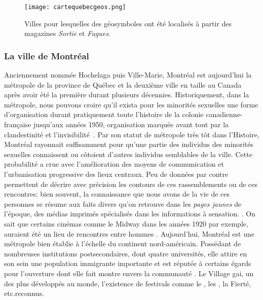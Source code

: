 \begin{figure}[ht]
 \begin{center}
 \texttt{[image: cartequebecgeos.png]}
 \end{center}
 \caption[Villes sélections à partir de \emph{Sortie} et \emph{Fugues}.]{Villes pour lesquelles des géosymboles ont été localisés à partir des magazines \emph{Sortie} et \emph{Fugues}.}\label{fig:cartequebecgeos}
\end{figure}

\subsubsection{La ville de Montréal}
\label{ssub:montreal}
Anciennement nommée Hochelaga puis Ville-Marie, Montréal est aujourd'hui la métropole de la province de Québec et la deuxième ville en taille au Canada après avoir été la première durant plusieurs décennies.
Historiquement, dans la métropole, nous pouvons croire qu'il exista pour les minorités sexuelles une forme d'organisation durant pratiquement toute l'histoire de la colonie canadienne-française jusqu’aux années 1950, organisation marquée avant tout par la clandestinité et l'invisibilité~\citep{Higgins1999}.
Par son statut de métropole très tôt dans l'Histoire, Montréal rayonnait suffisamment pour qu'une partie des individus des minorités sexuelles connaissent ou côtoient d'autres individus semblables de la ville.
Cette probabilité a crue avec l'amélioration des moyens de communication et l'urbanisation progressive des lieux centraux.
Peu de données par contre permettent de décrire avec précision les contours de ces rassemblements ou de ces rencontres; bien souvent, la connaissance que nous avons de la vie de ces personnes se résume aux faits divers qu'on retrouve dans les \emph{pages jaunes} de l'époque, des médias imprimés spécialisés dans les informations à sensation.
\citep[]{Higgins1999}.
On sait que certains cinémas comme le Midway dans les années 1920 par exemple, auraient été un lieu de rencontres entre hommes\citep[30]{Higgins1999} .
Aujourd'hui, Montréal est une métropole bien établie à l'échelle du continent nord-américain.
Possédant de nombreuses institutions postsecondaires, dont quatre universités, elle attire en son sein une population immigrante importante et est réputée à certains égards pour l'ouverture dont elle fait montre envers la communauté \lgbt{}.
Le Village gai, un des plus développés au monde, l'existence de festivals comme le , les , la Fierté, etc.\@sont reconnus.

